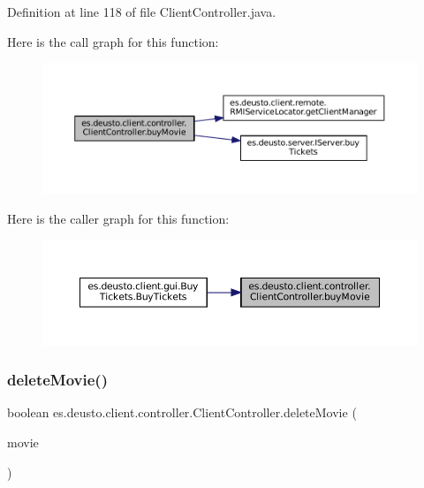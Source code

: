 Definition at line 118 of file Client\+Controller.\+java.

Here is the call graph for this function\+:
\nopagebreak
\begin{figure}[H]
\begin{center}
\leavevmode
\includegraphics[width=350pt]{classes_1_1deusto_1_1client_1_1controller_1_1_client_controller_a92f0a66750a4f02c11de68814bc0d96f_cgraph}
\end{center}
\end{figure}
Here is the caller graph for this function\+:
\nopagebreak
\begin{figure}[H]
\begin{center}
\leavevmode
\includegraphics[width=350pt]{classes_1_1deusto_1_1client_1_1controller_1_1_client_controller_a92f0a66750a4f02c11de68814bc0d96f_icgraph}
\end{center}
\end{figure}
\mbox{\label{classes_1_1deusto_1_1client_1_1controller_1_1_client_controller_acf2fc3025cb669a68fc0de5b1e3ee243}} 
\subsubsection{\texorpdfstring{deleteMovie()}{deleteMovie()}}
{\footnotesize\ttfamily boolean es.\+deusto.\+client.\+controller.\+Client\+Controller.\+delete\+Movie (\begin{DoxyParamCaption}\item[{\mbox{\hyperlink{classes_1_1deusto_1_1server_1_1data_1_1_movie_d_t_o}{Movie\+D\+TO}}}]{movie }\end{DoxyParamCaption})}



